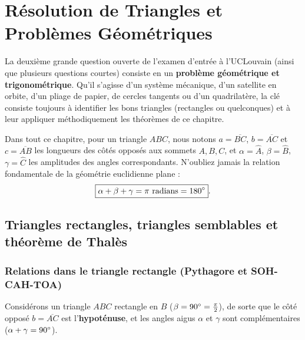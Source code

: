 \chapter[Résolution de Triangles et Problèmes]{Résolution de Triangles et Problèmes Géométriques}

La deuxième grande question ouverte de l'examen d'entrée à l'UCLouvain (ainsi que plusieurs questions courtes) consiste en un \textbf{problème géométrique et trigonométrique}. Qu'il s'agisse d'un système mécanique, d'un satellite en orbite, d'un pliage de papier, de cercles tangents ou d'un quadrilatère, la clé consiste toujours à identifier les bons triangles (rectangles ou quelconques) et à leur appliquer méthodiquement les théorèmes de ce chapitre.

Dans tout ce chapitre, pour un triangle $ABC$, nous notons $a = \overline{BC}$, $b = \overline{AC}$ et $c = \overline{AB}$ les longueurs des côtés opposés aux sommets $A, B, C$, et $\alpha = \widehat{A}$, $\beta = \widehat{B}$, $\gamma = \widehat{C}$ les amplitudes des angles correspondants. N'oubliez jamais la relation fondamentale de la géométrie euclidienne plane :
\[
    \boxed{\alpha + \beta + \gamma = \pi \text{ radians} = 180\degree}.
\]

\section{Triangles rectangles, triangles semblables et théorème de Thalès}

\subsection{Relations dans le triangle rectangle (Pythagore et SOH-CAH-TOA)}

Considérons un triangle $ABC$ rectangle en $B$ ($\beta = 90\degree = \frac{\pi}{2}$), de sorte que le côté opposé $b = \overline{AC}$ est l'\textbf{hypoténuse}, et les angles aigus $\alpha$ et $\gamma$ sont complémentaires ($\alpha + \gamma = 90\degree$).

